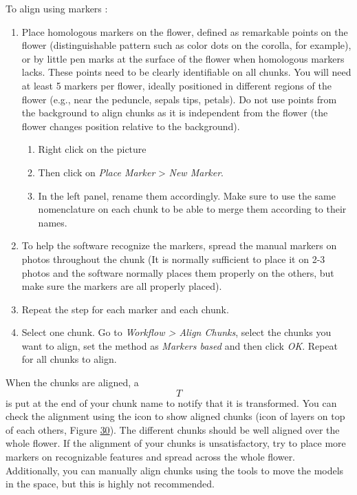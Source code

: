 \documentclass[
]{book}
\theoremstyle{definition}
\theoremstyle{definition}
\theoremstyle{definition}
\theoremstyle{definition}
\theoremstyle{remark}
\begin{document}
To align using markers :

\begin{enumerate}
\def\labelenumi{\arabic{enumi}.}
\item
  Place homologous markers on the flower, defined as remarkable points
  on the flower (distinguishable pattern such as color dots on the
  corolla, for example), or by little pen marks at the surface of the
  flower when homologous markers lacks. These points need to be
  clearly identifiable on all chunks. You will need at least 5 markers
  per flower, ideally positioned in different regions of the flower
  (e.g., near the peduncle, sepals tips, petals). Do not use points
  from the background to align chunks as it is independent from the
  flower (the flower changes position relative to the background).

  \begin{enumerate}
  \def\labelenumii{\arabic{enumii}.}
  \item
    Right click on the picture
  \item
    Then click on \emph{Place Marker} \textgreater{} \emph{New Marker}.
  \item
    In the left panel, rename them accordingly. Make sure to use the
    same nomenclature on each chunk to be able to merge them
    according to their names.
  \end{enumerate}
\item
  To help the software recognize the markers, spread the manual
  markers on photos throughout the chunk (It is normally sufficient to
  place it on 2-3 photos and the software normally places them
  properly on the others, but make sure the markers are all properly
  placed).
\item
  Repeat the step for each marker and each chunk.
\item
  Select one chunk. Go to \emph{Workflow \textgreater{} Align Chunks}, select the
  chunks you want to align, set the method as \emph{Markers based} and then
  click \emph{OK}. Repeat for all chunks to align.
\end{enumerate}

When the chunks are aligned, a \[T\] is put at the end of your chunk
name to notify that it is transformed. You can check the alignment using
the icon to show aligned chunks (icon of layers on top of each others,
Figure \protect\hyperlink{show_aligned_chunk}{30}). The different chunks should be well
aligned over the whole flower. If the alignment of your chunks is
unsatisfactory, try to place more markers on recognizable features and
spread across the whole flower. Additionally, you can manually align
chunks using the tools to move the models in the space, but this is
highly not recommended.
\end{document}
